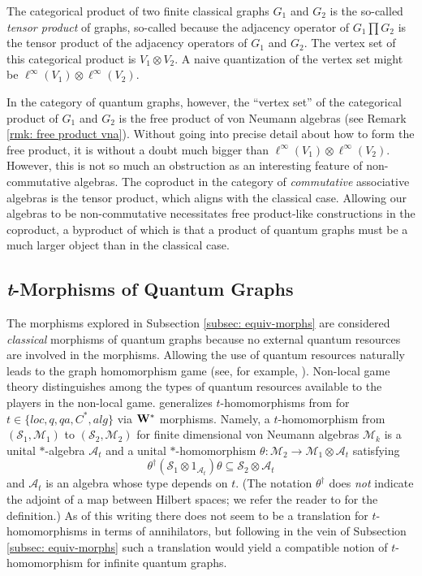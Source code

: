 \documentclass[12pt]{article}
\theoremstyle{definition}
\newcommand{\mc}[1]{\mathcal{#1}}
\newcommand{\<}{\langle}
\renewcommand{\>}{\rangle}
\renewcommand{\subset}{\subseteq}
\begin{document}
The categorical product of two finite classical graphs $G_1$ and $G_2$ is the so-called \textit{tensor product} of graphs, so-called because the adjacency operator of $G_1 \prod G_2$ is the tensor product of the adjacency operators of $G_1$ and $G_2$. The vertex set of this categorical product is $V_1 \otimes V_2$. A naive quantization of the vertex set might be $\ell^\infty(V_1) \otimes \ell^\infty(V_2)$.

In the category of quantum graphs, however, the ``vertex set'' of the categorical product of $G_1$ and $G_2$ is the free product of von Neumann algebras (see Remark \ref{rmk: free product vna}). Without going into precise detail about how to form the free product, it is without a doubt much bigger than $\ell^\infty(V_1) \otimes \ell^\infty(V_2)$. However, this is not so much an obstruction as an interesting feature of non-commutative algebras. The coproduct in the category of \textit{commutative} associative algebras is the tensor product, which aligns with the classical case. Allowing our algebras to be non-commutative necessitates free product-like constructions in the coproduct, a byproduct of which is that a product of quantum graphs must be a much larger object than in the classical case.

\subsection{\textit{t}-Morphisms of Quantum Graphs} \label{question: t-morphisms}

The morphisms explored in Subsection \ref{subsec: equiv-morphs} are considered \textit{classical} morphisms of quantum graphs because no external quantum resources are involved in the morphisms. Allowing the use of quantum resources naturally leads to the graph homomorphism game (see, for example, \cite{qtc-graph-hom}). Non-local game theory distinguishes among the types of quantum resources available to the players in the non-local game. \cite[Definition 4.1]{jun-alg-connect} generalizes $t$-homomorphisms from \cite{qtc-graph-hom} for $t \in \{loc, q, qa, C^*, alg\}$ via ${\bf W^*}$ morphisms. Namely, a $t$-homomorphism from $(\mc S_1, \mc M_1)$ to $(\mc S_2, \mc M_2)$ for finite dimensional von Neumann algebras $\mc M_k$ is a unital $*$-algebra $\mc A_t$ and a unital $*$-homomorphism $\theta: \mc M_2 \to \mc M_1 \otimes \mc A_t$ satisfying
\[
\theta^\dagger (\mc S_1 \otimes 1_{\mc A_t}) \theta \subset \mc S_2 \otimes \mc A_t
\]
and $\mc A_t$ is an algebra whose type depends on $t$. (The notation $\theta^\dagger$ does \textit{not} indicate the adjoint of a map between Hilbert spaces; we refer the reader to \cite{jun-alg-connect} for the definition.) As of this writing there does not seem to be a translation for $t$-homomorphisms in terms of annihilators, but following in the vein of Subsection \ref{subsec: equiv-morphs} such a translation would yield a compatible notion of $t$-homomorphism for infinite quantum graphs. 
\end{document}

